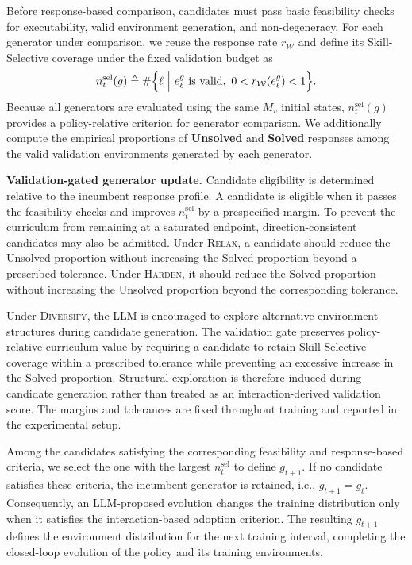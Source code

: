 \documentclass[conference]{IEEEtran}
\begin{document}
Before response-based comparison, candidates must pass basic feasibility checks
for executability, valid environment generation, and non-degeneracy. For each
generator under comparison, we reuse the response rate $r_{\mathcal W}$ and
define its Skill-Selective coverage under the fixed validation budget as
\begin{equation}
 n_t^{\mathrm{sel}}(g)
 \triangleq
 \#\Bigl\{
 \ell\ \Big|\ 
 e_\ell^g\ \text{is valid},\
 0<r_{\mathcal W}(e_\ell^g)<1
 \Bigr\}.
 \label{eq:skill-selective-coverage}
\end{equation}
Because all generators are evaluated using the same $M_v$ initial states,
$n_t^{\mathrm{sel}}(g)$ provides a policy-relative criterion for generator
comparison. We additionally compute the empirical proportions of
\textbf{Unsolved} and \textbf{Solved} responses among the valid validation
environments generated by each generator.

\textbf{Validation-gated generator update.}
Candidate eligibility is determined relative to the incumbent response profile.
A candidate is eligible when it passes the feasibility checks and improves
$n_t^{\mathrm{sel}}$ by a prespecified margin. To prevent the curriculum from
remaining at a saturated endpoint, direction-consistent candidates may also be
admitted. Under \textsc{Relax}, a candidate should reduce the Unsolved proportion
without increasing the Solved proportion beyond a prescribed tolerance. Under
\textsc{Harden}, it should reduce the Solved proportion without increasing the
Unsolved proportion beyond the corresponding tolerance.

Under \textsc{Diversify}, the LLM is encouraged to explore alternative
environment structures during candidate generation. The validation gate
preserves policy-relative curriculum value by requiring a candidate to retain
Skill-Selective coverage within a prescribed tolerance while preventing an
excessive increase in the Solved proportion. Structural exploration is therefore
induced during candidate generation rather than treated as an interaction-derived
validation score. The margins and tolerances are fixed throughout training and
reported in the experimental setup.

Among the candidates satisfying the corresponding feasibility and response-based
criteria, we select the one with the largest $n_t^{\mathrm{sel}}$ to define
$g_{t+1}$. If no candidate satisfies these criteria, the incumbent generator is
retained, i.e., $g_{t+1}=g_t$. Consequently, an LLM-proposed evolution changes
the training distribution only when it satisfies the interaction-based adoption
criterion. The resulting $g_{t+1}$ defines the environment distribution for the
next training interval, completing the closed-loop evolution of the policy and
its training environments.
\end{document}
